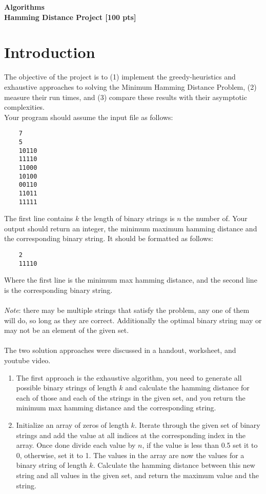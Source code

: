 \documentclass{article}
\begin{document}
\begin{center}
    \large\textbf{Algorithms}\\
    \Large\textbf{Hamming Distance Project [100 pts]}
\end{center}



\section{Introduction}
The objective of the project is to (1) implement the greedy-heuristics and exhaustive approaches to solving the Minimum Hamming Distance Problem, (2) measure their run times, and (3) compare these results with their asymptotic complexities. \\ Your program should assume the input file as follows:
\begin{verbatim}
    7
    5
    10110
    11110
    11000
    10100
    00110
    11011
    11111
\end{verbatim}
The first line contains $k$ the length of binary strings is $n$ the number of. Your output should return an integer, the minimum maximum hamming distance and the corresponding binary string. It should be formatted as follows:
\begin{verbatim}
    2
    11110
\end{verbatim}
Where the first line is the minimum max hamming distance, and the second line is the corresponding binary string.\\ \\ \textit{Note}: there may be multiple strings that satisfy the problem, any one of them will do, so long as they are correct. Additionally the optimal binary string may or may not be an element of the given set.\\ \\
The two solution approaches were discussed in a handout, worksheet, and youtube video.
\begin{enumerate}
    \item The first approach is the exhaustive algorithm, you need to generate all possible binary strings of length $k$ and calculate the hamming distance for each of those and each of the strings in the given set, and you return the minimum max hamming distance and the corresponding string.
    \item Initialize an array of zeros of length $k$. Iterate through the given set of binary strings and add the value at all indices at the corresponding index in the array. Once done divide each value by $n$, if the value is less than 0.5 set it to 0, otherwise, set it to 1. The values in the array are now the values for a binary string of length $k$. Calculate the hamming distance between this new string and all values in the given set, and return the maximum value and the string.
\end{enumerate}
\newpage
\end{document}
